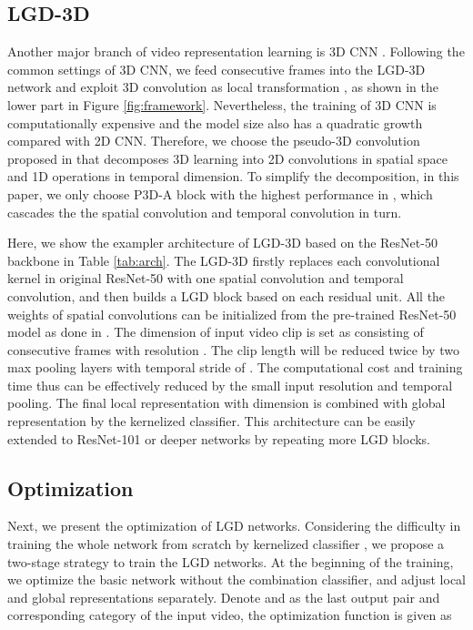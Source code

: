 \documentclass[10pt,twocolumn,letterpaper]{article}
\begin{document}
\subsection{LGD-3D}
Another major branch of video representation learning is 3D CNN \cite{ji20133d,qiu2017learning,tran2015learning}. Following the common settings of 3D CNN, we feed  consecutive frames into the LGD-3D network and exploit 3D convolution as local transformation , as shown in the lower part in Figure \ref{fig:framework}. Nevertheless, the training of 3D CNN is computationally expensive and the model size also has a quadratic growth compared with 2D CNN. Therefore, we choose the pseudo-3D convolution proposed in \cite{qiu2017learning} that decomposes 3D learning into 2D convolutions in spatial space and 1D operations in temporal dimension. To simplify the decomposition, in this paper, we only choose P3D-A block with the highest performance in \cite{qiu2017learning}, which cascades the the spatial convolution and temporal convolution in turn.

Here, we show the exampler architecture of LGD-3D based on the ResNet-50 \cite{he2015deep} backbone in Table \ref{tab:arch}. The LGD-3D firstly replaces each  convolutional kernel in original ResNet-50 with one  spatial convolution and  temporal convolution, and then builds a LGD block based on each residual unit. All the weights of spatial convolutions can be initialized from the pre-trained ResNet-50 model as done in \cite{qiu2017learning}. The dimension of input video clip is set as  consisting of  consecutive frames with resolution . The clip length will be reduced twice by two max pooling layers with temporal stride of . The computational cost and training time thus can be effectively reduced by the small input resolution and temporal pooling. The final local representation with dimension  is combined with global representation by the kernelized classifier. This architecture can be easily extended to ResNet-101 or deeper networks by repeating more LGD blocks.

\subsection{Optimization} \label{sec:opt}

Next, we present the optimization of LGD networks. Considering the difficulty in training the whole network from scratch by kernelized classifier \cite{gao2016compact,lin2015bilinear}, we propose a two-stage strategy to train the LGD networks. At the beginning of the training, we optimize the basic network without the combination classifier, and adjust local and global representations separately. Denote  and  as the last output pair and corresponding category of the input video, the optimization function is given as
\end{document}
